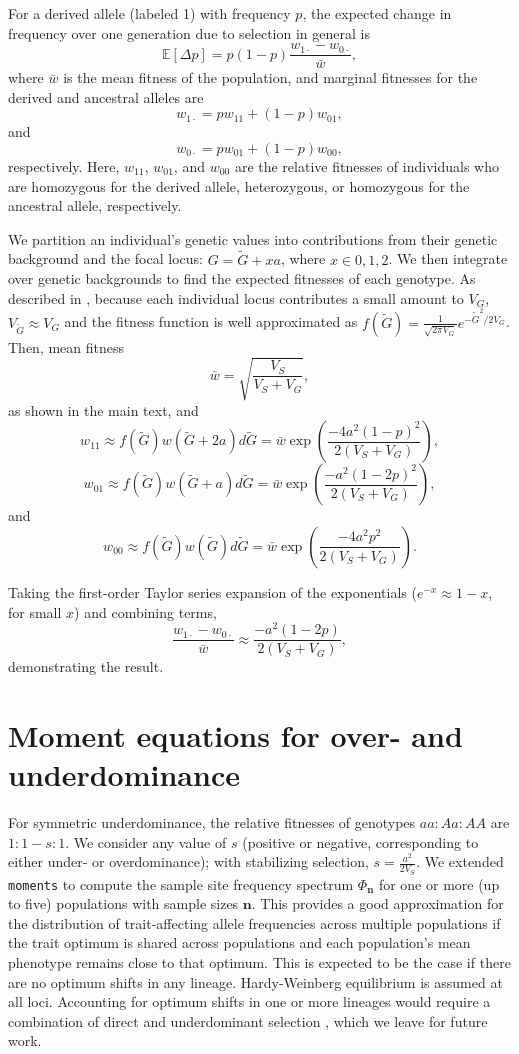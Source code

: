 \documentclass{article}
\newcommand{\E}{\mathbb{E}}
\newcommand{\moments}{\texttt{moments}\xspace}
\begin{document}
For a derived allele (labeled 1) with frequency $p$, the expected change in
frequency over one generation due to selection in general is
\[\E[\Delta p]=p(1-p)\frac{w_{1\cdot}-w_{0\cdot}}{\bar{w}},\]
where \(\bar{w}\) is the mean fitness of the population, and marginal fitnesses
for the derived and ancestral alleles are
\[w_{1\cdot}=p w_{11} + (1-p)w_{01},\]
and
\[w_{0\cdot}=p w_{01} + (1-p)w_{00},\]
respectively. Here, $w_{11}$, $w_{01}$, and $w_{00}$ are the relative fitnesses
of individuals who are homozygous for the derived allele, heterozygous, or
homozygous for the ancestral allele, respectively.

We partition an individual's genetic values into contributions from their
genetic background and the focal locus: $G=\tilde{G}+xa$, where $x\in{0,1,2}$.
We then integrate over genetic backgrounds to find the expected fitnesses of
each genotype. As described in \citet[][SI section 2.1]{simons2018population},
because each individual locus contributes a small amount to $V_G$,
$V_{\tilde{G}}\approx V_G$ and the fitness function is well approximated as
\(f(\tilde{G})=\frac{1}{\sqrt{2\pi V_G}}e^{-\tilde{G}^2/2V_G}\). Then,
mean fitness
\[
    \bar{w} = \sqrt{\frac{V_S}{V_S+V_G}},
\]
as shown in the main text, and
\[ 
    w_{11} \approx f(\tilde{G}) w(\tilde{G} + 2a) d\tilde{G}
    = \bar{w}\exp{\left(\frac{-4a^2(1-p)^2}{2(V_S+V_G)}\right)},
\]
\[
    w_{01} \approx f(\tilde{G}) w(\tilde{G} + a) d\tilde{G}
    = \bar{w}\exp{\left(\frac{-a^2(1-2p)^2}{2(V_S+V_G)}\right)},
\]
and
\[
    w_{00} \approx f(\tilde{G}) w(\tilde{G}) d\tilde{G}
    = \bar{w}\exp{\left(\frac{-4a^2p^2}{2(V_S+V_G)}\right)}.
\]

Taking the first-order Taylor series expansion of the exponentials
($e^{-x}\approx1-x$, for small $x$) and combining terms,
\[
    \frac{w_{1\cdot} - w_{0\cdot}}{\bar{w}} \approx \frac{-a^2(1-2p)}{2(V_S+V_G)},
\]
demonstrating the result.

\section{Moment equations for over- and underdominance}
\label{sec:moments-underdominance}

For symmetric underdominance, the relative fitnesses of genotypes \(aa:Aa:AA\)
are \(1:1-s:1\). We consider any value of $s$ (positive or negative,
corresponding to either under- or overdominance); with stabilizing selection,
\(s=\frac{a^2}{2V_S}\). We extended \moments \citep{jouganous2017inferring} to
compute the sample site frequency spectrum \(\Phi_{\mathbf{n}}\) for one or
more (up to five) populations with sample sizes \(\mathbf{n}\). This provides a
good approximation for the distribution of trait-affecting allele frequencies
across multiple populations if the trait optimum is shared across populations
and each population's mean phenotype remains close to that optimum. This is
expected to be the case if there are no optimum shifts in any lineage.
Hardy-Weinberg equilibrium is assumed at all loci. Accounting for optimum
shifts in one or more lineages would require a combination of direct and
underdominant selection \citep[e.g.,][]{hayward2022polygenic}, which we leave
for future work.
\end{document}
